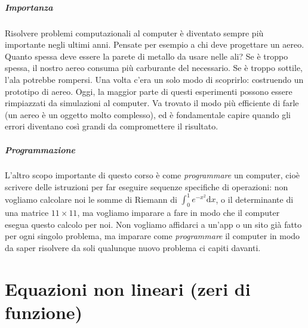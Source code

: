 \documentclass[a4paper]{report}
\theoremstyle{definition}
\theoremstyle{remark}
\begin{document}
\paragraph{Importanza} Risolvere problemi computazionali al computer è diventato sempre più importante negli ultimi anni. Pensate per esempio a chi deve progettare un aereo. Quanto spessa deve essere la parete di metallo da usare nelle ali? Se è troppo spessa, il nostro aereo consuma più carburante del necessario. Se è troppo sottile, l'ala potrebbe rompersi. Una volta c'era un solo modo di scoprirlo: costruendo un prototipo di aereo. Oggi, la maggior parte di questi esperimenti possono essere rimpiazzati da simulazioni al computer. Va trovato il modo più efficiente di farle (un aereo è un oggetto molto complesso), ed è fondamentale capire quando gli errori diventano così grandi da compromettere il risultato.

\paragraph{Programmazione} L'altro scopo importante di questo corso è come \emph{programmare} un computer, cioè scrivere delle istruzioni per far eseguire sequenze specifiche di operazioni: non vogliamo calcolare noi le somme di Riemann di $\int_0^1 e^{-x^2} \mathrm{d}x$, o il determinante di una matrice $11\times 11$, ma vogliamo imparare a fare in modo che il computer esegua questo calcolo per noi. Non vogliamo affidarci a un'app o un sito già fatto per ogni singolo problema, ma imparare come \emph{programmare} il computer in modo da saper risolvere da soli qualunque nuovo problema ci capiti davanti.

\chapter{Equazioni non lineari (zeri di funzione)}
\end{document}
